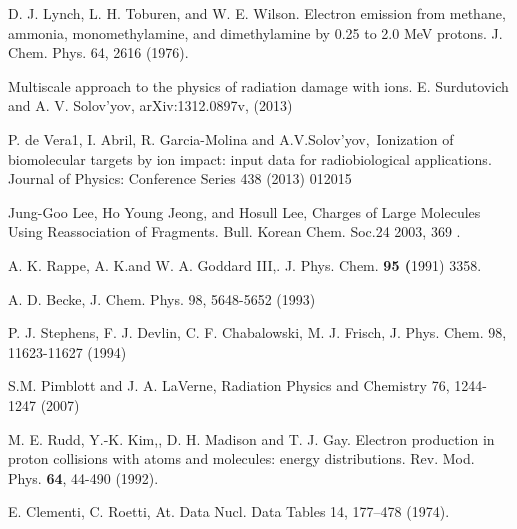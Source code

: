 \documentclass[preprint,12pt]{article}
\begin{document}
\begin{thebibliography}{99}
D. J. Lynch, L. H. Toburen, and W. E. Wilson. Electron
emission from methane, ammonia, monomethylamine, and dimethylamine by 0.25
to 2.0 MeV protons. 
J. Chem. Phys. 64, 2616 (1976).

Multiscale approach to the physics of radiation
damage with ions. E. Surdutovich and A. V. Solov'yov, 
arXiv:1312.0897v, (2013)

P. de Vera1, I. Abril, R. Garcia-Molina and
A.V.Solov'yov,\ Ionization of biomolecular targets by ion impact: input data
for radiobiological applications. 
Journal of Physics: Conference Series 438
(2013) 012015

Jung-Goo Lee, Ho Young Jeong, and Hosull Lee, Charges of
Large Molecules Using Reassociation of Fragments. 
Bull. Korean Chem. Soc.24 2003, 369 .

A. K. Rappe, A. K.and W. A. Goddard III,. 
J. Phys. Chem. \textbf{95 (}1991) 3358.

A. D. Becke, 
J. Chem. Phys. 98, 5648-5652 (1993) 

P. J. Stephens, F. J. Devlin, C. F. Chabalowski, M. J. Frisch,
J. Phys. Chem. 98, 11623-11627 (1994) 

S.M. Pimblott and J. A. LaVerne, Radiation
Physics and Chemistry 76, 1244-1247 (2007)

M. E. Rudd, Y.-K. Kim,, D. H. Madison and T. J. Gay.
Electron production in proton collisions with atoms and molecules: energy
distributions. 
Rev. Mod. Phys. \textbf{64}, 44-490 (1992).

E. Clementi, C. Roetti,
At. Data Nucl. Data Tables 14, 177--478 (1974).


\end{thebibliography}
\end{document}
